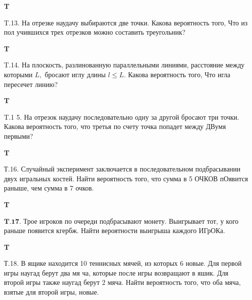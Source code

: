 \documentclass[a4paper,12pt]{article} %
\begin{document}
\begin{example}\textbf{T}

T.13. На отрезке наудачу выбираются две точки. Какова вероятность того, Что из пол учившихся трех отрезков можно составить треугольник?


\end{example}




\begin{example}\textbf{T}

T.14. На плоскость, разлинованную параллельными линиями, расстояние между которыми $L,$ бросают иглу длины $l \leqslant L .$ Какова вероятность
того, Что игла пересечет линию?


\end{example}


\begin{example}\textbf{T}

T.1 5. На отрезок наудачу последовательно одну за другой бросают три точки. Какова вероятность того, что третья по счету точка попадет между ДВумя первыми?


\end{example}





\begin{example}\textbf{T}

Т.16. Случайный эксперимент заключается в последовательном подбрасывании двух игральных костей. Найти вероятность того, что сумма в 5 ОЧКОВ пОявится раныше, чем сумма в 7 очков.

\end{example}


\begin{example}\textbf{T}

$\mathbf{T . 1 7 .}$ Трое игроков по очереди подбрасывают монету. Выигрывает тот, у кого раньше появится кгербж. Найти вероятности выигрыша каждого
ИГрОКа.



\end{example}


\begin{example}\textbf{T}

Т.18. В ящике находится 10 теннисных мячей, из которых 6 новые. Для первой игры наугад берут два мя ча, которые после игры возвращают в яшик. Для второй игры также наугад берут 2 мяча. Найти вероятность
того, что оба мяча, взятые для второй игры, новые.



\end{example}
\end{document}
